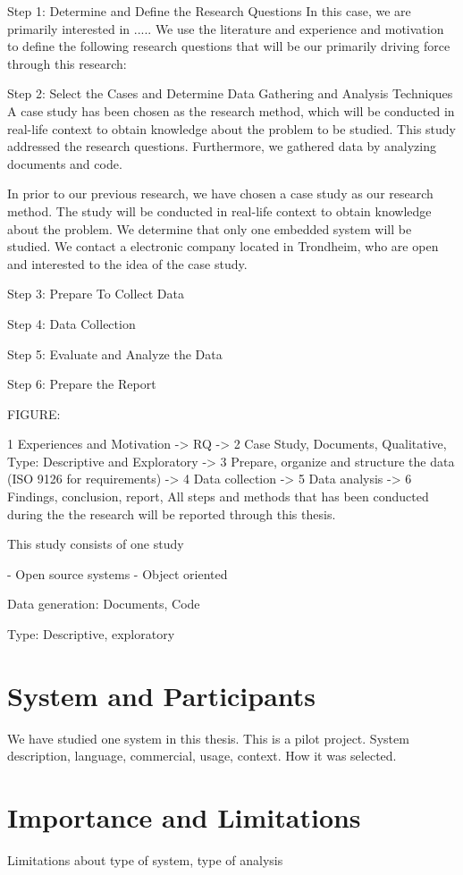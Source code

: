 Step 1: Determine and Define the Research Questions
In this case, we are primarily interested in ..... We use the literature and experience and motivation to define the following research questions that will be our primarily driving force through this research:



Step 2: Select the Cases and Determine Data Gathering and Analysis Techniques
A case study has been chosen as the research method, which will be conducted in real-life context to obtain knowledge about the problem to be studied. This study addressed the research questions. Furthermore, we gathered data by analyzing documents and code. %

In prior to our previous research, we have chosen a case study as our research method. The study will be conducted in real-life context to obtain knowledge about the problem.  We determine that only one embedded system will be studied. We contact a electronic company located in Trondheim, who are open and interested to the idea of the case study.

Step 3: Prepare To Collect Data

Step 4: Data Collection

Step 5: Evaluate and Analyze the Data

Step 6: Prepare the Report


FIGURE:

1 {Experiences and Motivation -> RQ} -> 2 {Case Study, Documents, Qualitative, Type: Descriptive and Exploratory} -> 3 {Prepare, organize and structure the data (ISO 9126 for requirements)} -> 4 {Data collection} -> 5 {Data analysis} -> 6 {Findings, conclusion, report,  All steps and methods that has been conducted during the the research will be reported through this thesis. }



This study consists of one study

- Open source systems
- Object oriented

Data generation: Documents, Code

Type: Descriptive, exploratory


\section{System and Participants}
We have studied one system in this thesis. This is a pilot project. System description, language, commercial, usage, context. How it was selected.



      


\section{Importance and Limitations}
Limitations about type of system, type of analysis

